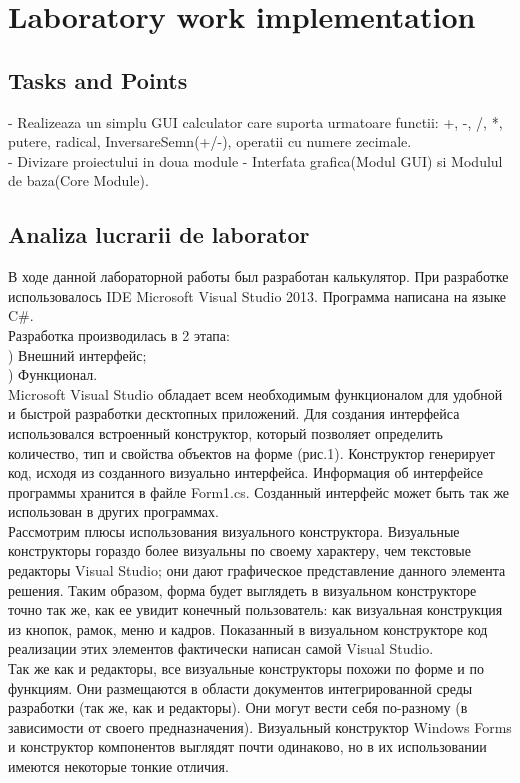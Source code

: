 \section{Laboratory work implementation}

\subsection{Tasks and Points}

- Realizeaza un simplu GUI calculator care suporta urmatoare functii: +, -, /, *, putere, radical, InversareSemn(+/-), operatii cu numere zecimale.\\
\indent 
- Divizare proiectului in doua module - Interfata grafica(Modul GUI) si Modulul de baza(Core Module).

\subsection{Analiza lucrarii de laborator}
В ходе данной лабораторной работы был разработан калькулятор. При разработке использовалось IDE Microsoft Visual Studio 2013. Программа написана на языке C\#.\\
\indent 
Разработка производилась в 2 этапа:\\
) Внешний интерфейс;\\
) Функционал.\\
\indent 
Microsoft Visual Studio обладает всем необходимым функционалом для удобной и быстрой разработки десктопных приложений. Для создания интерфейса использовался встроенный конструктор, который позволяет определить количество, тип и свойства объектов на форме (рис.1). Конструктор генерирует код, исходя из созданного визуально интерфейса. Информация об интерфейсе программы хранится в файле Form1.cs. Созданный интерфейс может быть так же использован в других программах. \\
\indent 
Рассмотрим плюсы использования визуального конструктора. Визуальные конструкторы гораздо более визуальны по своему характеру, чем текстовые редакторы Visual Studio; они дают графическое представление данного элемента решения. Таким образом, форма будет выглядеть в визуальном конструкторе точно так же, как ее увидит конечный пользователь: как визуальная конструкция из кнопок, рамок, меню и кад­ров. Показанный в визуальном конструкторе код реализации этих элементов фактически написан самой Visual Studio.\\
\indent 
Так же как и редакторы, все визуальные конструкторы похожи по форме и по функциям. Они размещаются в области документов интегрированной среды разработки (так же, как и редакторы). Они могут вести себя по-разному (в зависимости от своего предназначения). Визуальный конструктор Windows Forms и конструктор компонентов выглядят почти оди­наково, но в их использовании имеются некоторые тонкие отличия.\\

